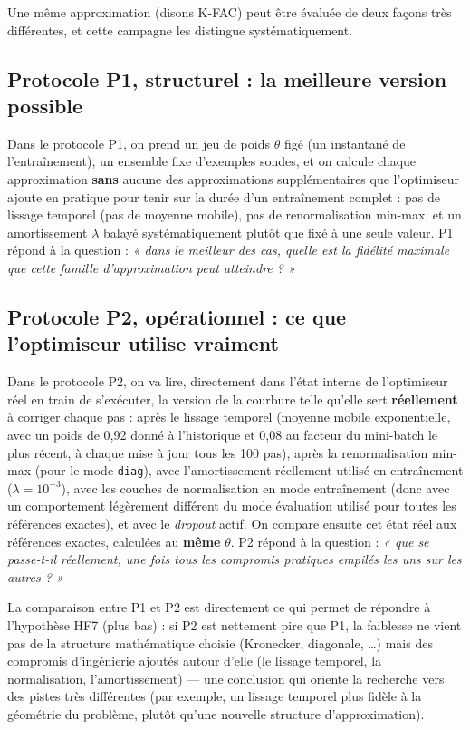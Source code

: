 \documentclass[11pt,a4paper]{article}
\newcommand{\eng}[1]{\emph{#1}}
\begin{document}
Une même approximation (disons K-FAC) peut être évaluée de deux façons très différentes, et cette
campagne les distingue systématiquement.

\subsection{Protocole P1, structurel : la meilleure version possible}

Dans le protocole P1, on prend un jeu de poids $\theta$ figé (un instantané de l'entraînement), un
ensemble fixe d'exemples sondes, et on calcule chaque approximation \textbf{sans} aucune des
approximations supplémentaires que l'optimiseur ajoute en pratique pour tenir sur la durée d'un
entraînement complet : pas de lissage temporel (pas de moyenne mobile), pas de renormalisation
min-max, et un amortissement $\lambda$ balayé systématiquement plutôt que fixé à une seule valeur.
P1 répond à la question : \emph{« dans le meilleur des cas, quelle est la fidélité maximale que
cette famille d'approximation peut atteindre ? »}

\subsection{Protocole P2, opérationnel : ce que l'optimiseur utilise vraiment}

Dans le protocole P2, on va lire, directement dans l'état interne de l'optimiseur réel en train de
s'exécuter, la version de la courbure telle qu'elle sert \textbf{réellement} à corriger chaque pas :
après le lissage temporel (moyenne mobile exponentielle, avec un poids de 0,92 donné à l'historique
et 0,08 au facteur du mini-batch le plus récent, à chaque mise à jour tous les 100 pas), après la
renormalisation min-max (pour le mode \texttt{diag}), avec l'amortissement réellement utilisé en
entraînement ($\lambda=10^{-3}$), avec les couches de normalisation en mode entraînement (donc avec
un comportement légèrement différent du mode évaluation utilisé pour toutes les références exactes),
et avec le \eng{dropout} actif. On compare ensuite cet état réel aux références exactes, calculées
au \textbf{même} $\theta$. P2 répond à la question : \emph{« que se passe-t-il réellement, une fois
tous les compromis pratiques empilés les uns sur les autres ? »}

La comparaison entre P1 et P2 est directement ce qui permet de répondre à l'hypothèse HF7 (plus
bas) : si P2 est nettement pire que P1, la faiblesse ne vient pas de la structure mathématique
choisie (Kronecker, diagonale, \dots) mais des compromis d'ingénierie ajoutés autour d'elle (le
lissage temporel, la normalisation, l'amortissement) — une conclusion qui oriente la recherche vers
des pistes très différentes (par exemple, un lissage temporel plus fidèle à la géométrie du
problème, plutôt qu'une nouvelle structure d'approximation).
\end{document}
